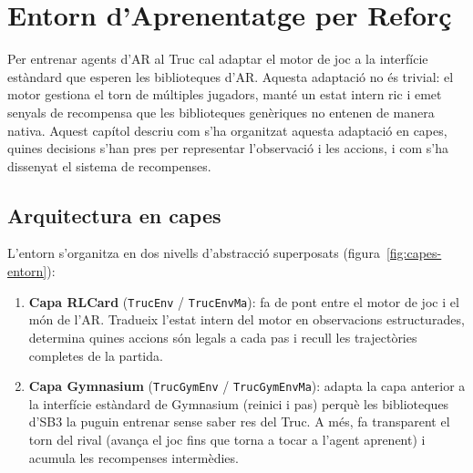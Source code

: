 ﻿%

\chapter{Entorn d'Aprenentatge per Reforç}
\label{cap:entorns}

Per entrenar agents d'\ac{AR} al Truc cal adaptar el motor de joc a la interfície
estàndard que esperen les biblioteques d'\ac{AR}. Aquesta adaptació no és trivial:
el motor gestiona el torn de múltiples jugadors, manté un estat intern ric i emet
senyals de recompensa que les biblioteques genèriques no entenen de manera nativa.
Aquest capítol descriu com s'ha organitzat aquesta adaptació en capes, quines
decisions s'han pres per representar l'observació i les accions, i com s'ha dissenyat
el sistema de recompenses.

\section{Arquitectura en capes}
\label{sec:capes-entorn}

L'entorn s'organitza en dos nivells d'abstracció superposats (figura~\ref{fig:capes-entorn}):

\begin{enumerate}
  \item \textbf{Capa RLCard} (\texttt{TrucEnv} / \texttt{TrucEnvMa}): fa de pont
        entre el motor de joc i el món de l'\ac{AR}. Tradueix l'estat intern del motor
        en observacions estructurades, determina quines accions són legals a cada pas
        i recull les trajectòries completes de la partida.

  \item \textbf{Capa Gymnasium} (\texttt{TrucGymEnv} / \texttt{TrucGymEnvMa}): adapta
        la capa anterior a la interfície estàndard de Gymnasium (reinici i pas) perquè
        les biblioteques d'\ac{SB3} la puguin entrenar sense saber res del Truc. A
        més, fa transparent el torn del rival (avança el joc fins que torna a tocar a
        l'agent aprenent) i acumula les recompenses intermèdies.
\end{enumerate}

